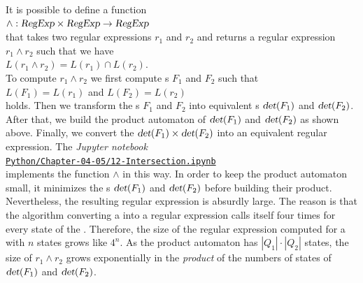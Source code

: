 \remarkEng
It is possible to define a function
\\[0.2cm]
\hspace*{1.3cm}
$\wedge: \textsl{RegExp} \times \textsl{RegExp} \rightarrow \textsl{RegExp}$
\\[0.2cm]
that takes two regular expressions $r_1$ and $r_2$ and returns a regular expression  $r_1 \wedge r_2$ such that
we have
\\[0.2cm]
\hspace*{1.3cm}
$L(r_1 \wedge r_2) = L(r_1) \cap L(r_2)$.
\\[0.2cm]
To compute $r_1 \wedge r_2$ we first compute  s  $F_1$ and $F_2$ such that
\\[0.2cm]
\hspace*{1.3cm}
$L(F_1) = L(r_1)$ \quad and \quad $L(F_2) = L(r_2)$
\\[0.2cm] 
holds.  Then we transform the s $F_1$ and $F_2$ into equivalent 
s $\textsl{det}(F_1)$ and $\textsl{det}(F_2)$.  After that, we build
the product automaton of $\textsl{det}(F_1)$ and $\textsl{det}(F_2)$ as shown above.
Finally, we convert the  $\textsl{det}(F_1) \times\textsl{det}(F_2)$ into an equivalent
regular expression.  The \textsl{Jupyter notebook}
\\[0.2cm]
\hspace*{1.3cm}
\href{https://github.com/karlstroetmann/Formal-Languages/blob/master/Python/Chapter-04-05/12-Intersection.ipynb}{\texttt{Python/Chapter-04-05/12-Intersection.ipynb}}
\\[0.2cm]
implements the function $\wedge$ in this way.  In order to keep the product automaton small, it minimizes
the s $\textsl{det}(F_1)$ and $\textsl{det}(F_2)$ before building their product.
Nevertheless, the resulting regular expression is absurdly large.  The reason is that the algorithm converting a
 into a regular expression calls itself four times for every state of the .
Therefore, the size of the regular expression computed for a  with $n$ states grows like $4^n$.
As the product automaton has $|Q_1| \cdot |Q_2|$ states, the size of $r_1 \wedge r_2$ grows exponentially in
the \emph{product} of the numbers of states of $\textsl{det}(F_1)$ and $\textsl{det}(F_2)$.

